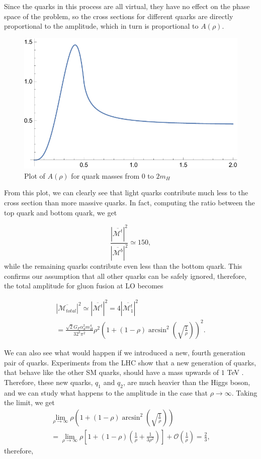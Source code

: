\documentclass[EPJ,twocolumn]{webofc}
\begin{document}
Since the quarks in this process are all virtual, they have no effect on the phase space of the problem, so the cross sections for different quarks are directly proportional to the amplitude, which in turn is proportional to $A\left(\rho\right)$.

\begin{figure}[ht]
    \centering
    \includegraphics[width=.6\columnwidth]{Images/f(p).pdf}
    \caption{Plot of $A\left(\rho\right)$ for quark masses from $0$ to $2m_H$ }
    \label{fp}
\end{figure}
From this plot, we can clearly see that light quarks contribute much less to the cross section than more massive quarks. In fact, computing the ratio between the top quark and bottom quark, we get

\begin{equation}
    \frac{|\overline{\mathcal{M}^t}|^2}{|\overline{\mathcal{M}^b}|^2} \simeq 150,
\end{equation}
while the remaining quarks contribute even less than the bottom quark. This confirms our assumption that all other quarks can be safely ignored, therefore, the total amplitude for gluon fusion at LO becomes

\begin{multline}
    |\overline{\mathcal{M}_{total}}|^2 \simeq |\overline{\mathcal{M}^t}|^2= 4|\overline{\mathcal{M}_1^t}|^2 \\ = \frac{\sqrt{2}G_F\alpha_S^2m_H^4}{32^2\pi^2}\rho^2\left( 1+(1-\rho)\arcsin^2{\left(\sqrt{\frac{1}{\rho}} \right)}\right)^2 .
\end{multline}

We can also see what would happen if we introduced a new, fourth generation pair of quarks. Experiments from the LHC show that a new generation of quarks, that behave like the other SM quarks, should have a mass upwards of $1$ TeV \cite{CMS:2019eqb}. Therefore, these new quarks, $q_1 $ and $q_2$, are much heavier than the Higgs boson, and we can study what happens to the amplitude in the case that $\rho \rightarrow \infty$. Taking the limit, we get
\begin{multline}
    \lim_{\rho\rightarrow\infty} \rho\left( 1+(1-\rho)\arcsin^2{\left(\sqrt{\frac{1}{\rho}} \right)}\right) \\  =  \lim_{\rho\rightarrow\infty} \rho\left[1+(1-\rho)\left(\frac{1}{\rho}+\frac{1}{3\rho^2}\right) \right] + \mathcal{O}\left(\frac{1}{\rho}\right) = \frac{2}{3},
\end{multline}
therefore,
\end{document}
